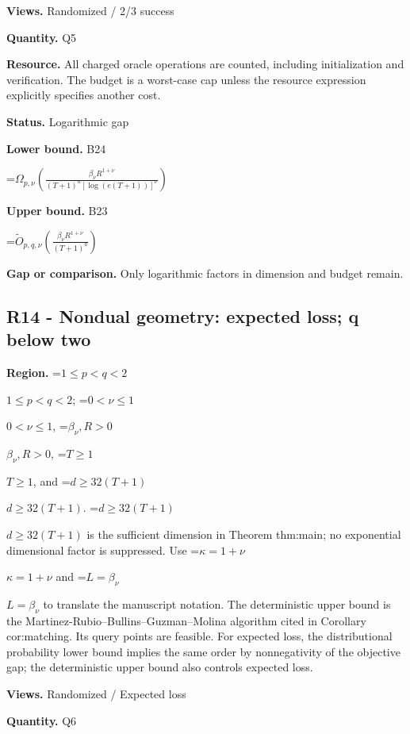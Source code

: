 \documentclass[10pt,a4paper]{article}
\newcommand{\AtlasMath}[1]{\par\begingroup\centering\setbox0=\hbox{$\displaystyle #1$}\ifdim\wd0>1.4\linewidth\typeout{ATLAS WIDE FORMULA: \the\wd0}\fi\ifdim\wd0>\linewidth\resizebox{\linewidth}{!}{\box0}\else\box0\fi\par\endgroup}
\newcommand{\AtlasInlineMath}[1]{\begingroup\setbox0=\hbox{$#1$}\ifdim\wd0>.4\linewidth\endgroup\AtlasMath{#1}\else\endgroup$#1$\fi}
\begin{document}
\textbf{Views.} Randomized / 2/3 success



\textbf{Quantity.} Q5



\textbf{Resource.} All charged oracle operations are counted, including initialization and verification. The budget is a worst-case cap unless the resource expression explicitly specifies another cost.



\textbf{Status.} Logarithmic gap



\textbf{Lower bound.} B24



\AtlasMath{\Omega_{p,\nu}\!\left(\frac{\beta_\nu R^{1+\nu}}{(T+1)^a[\log(e(T+1))]^\nu}\right)}


\textbf{Upper bound.} B23



\AtlasMath{\widetilde O_{p,q,\nu}\!\left(\frac{\beta_\nu R^{1+\nu}}{(T+1)^a}\right)}


\textbf{Gap or comparison.} Only logarithmic factors in dimension and budget remain.



\subsection{R14 - Nondual geometry: expected loss; q below two}


\textbf{Region.} \AtlasInlineMath{1\le p<q<2}; \AtlasInlineMath{0<\nu\le1}, \AtlasInlineMath{\beta_\nu,R>0}, \AtlasInlineMath{T\ge1}, and \AtlasInlineMath{d\ge32(T+1)}. \AtlasInlineMath{d\ge32(T+1)} is the sufficient dimension in Theorem thm:main; no exponential dimensional factor is suppressed. Use \AtlasInlineMath{\kappa=1+\nu} and \AtlasInlineMath{L=\beta_\nu} to translate the manuscript notation. The deterministic upper bound is the Martinez-Rubio--Bullins--Guzman--Molina algorithm cited in Corollary cor:matching. Its query points are feasible. For expected loss, the distributional probability lower bound implies the same order by nonnegativity of the objective gap; the deterministic upper bound also controls expected loss.



\textbf{Views.} Randomized / Expected loss



\textbf{Quantity.} Q6
\end{document}
